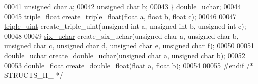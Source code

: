 \begin{DoxyCode}
00041     \textcolor{keywordtype}{unsigned} \textcolor{keywordtype}{char} a;
00042     \textcolor{keywordtype}{unsigned} \textcolor{keywordtype}{char} b;
00043 \} \hyperlink{structdouble__uchar}{double\_uchar};
00044 
00045 \hyperlink{structtriple__float}{triple\_float} create\_triple\_float(\textcolor{keywordtype}{float} a, \textcolor{keywordtype}{float} b, \textcolor{keywordtype}{float} c);
00046 
00047 \hyperlink{structtriple__uint}{triple\_uint} create\_triple\_uint(\textcolor{keywordtype}{unsigned} \textcolor{keywordtype}{int} a, \textcolor{keywordtype}{unsigned} \textcolor{keywordtype}{int} b, \textcolor{keywordtype}{unsigned} \textcolor{keywordtype}{int} c);
00048 
00049 \hyperlink{structsix__uchar}{six\_uchar} create\_six\_uchar(\textcolor{keywordtype}{unsigned} \textcolor{keywordtype}{char} a, \textcolor{keywordtype}{unsigned} \textcolor{keywordtype}{char} b, \textcolor{keywordtype}{unsigned} \textcolor{keywordtype}{char} c, \textcolor{keywordtype}{unsigned} \textcolor{keywordtype}{char} d, \textcolor{keywordtype}{
      unsigned} \textcolor{keywordtype}{char} e, \textcolor{keywordtype}{unsigned} \textcolor{keywordtype}{char} f);
00050 
00051 \hyperlink{structdouble__uchar}{double\_uchar} create\_double\_uchar(\textcolor{keywordtype}{unsigned} \textcolor{keywordtype}{char} a, \textcolor{keywordtype}{unsigned} \textcolor{keywordtype}{char} b);
00052 
00053 \hyperlink{structdouble__float}{double\_float} create\_double\_float(\textcolor{keywordtype}{float} a, \textcolor{keywordtype}{float} b);
00054 
00055 \textcolor{preprocessor}{#endif }\textcolor{comment}{/* STRUCTS\_H\_ */}\textcolor{preprocessor}{}
\end{DoxyCode}
